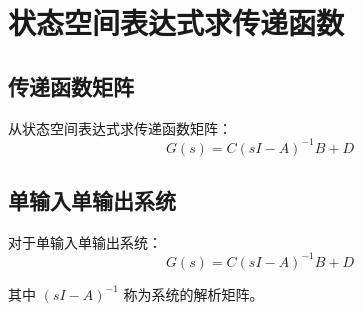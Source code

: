 \section{状态空间表达式求传递函数}

\subsection{传递函数矩阵}
从状态空间表达式求传递函数矩阵：
\[G(s) = C(sI - A)^{-1}B + D\]

\subsection{单输入单输出系统}
对于单输入单输出系统：
\[G(s) = C(sI - A)^{-1}B + D\]

其中 $(sI - A)^{-1}$ 称为系统的解析矩阵。
